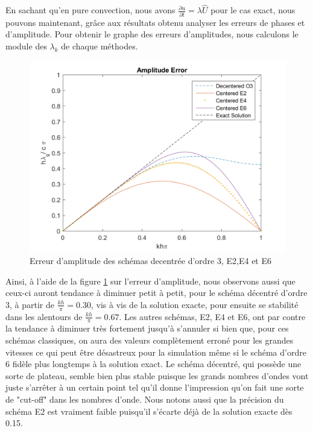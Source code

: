 \documentclass{article}
\begin{document}
En sachant qu'en pure convection, nous avons $ \frac{\partial u}{\partial t} = \lambda \widehat{U}$ pour le cas exact, nous pouvons maintenant, grâce aux résultats obtenu analyser les erreurs de phases et d'amplitude. Pour obtenir le graphe des erreurs d'amplitudes, nous calculons le module des $\lambda_k$ de chaque méthodes.
\begin{figure}[H]
    \centering
    \includegraphics[scale=0.55]{img/fig1.png}
    \caption{Erreur d'amplitude des schémas decentrée d'ordre 3, E2,E4 et E6}
    \label{fig1}
\end{figure}
Ainsi, à l'aide de la figure \ref{fig1} sur l'erreur d'amplitude, nous observons aussi que ceux-ci auront tendance à diminuer petit à petit, pour le schéma décentré d'ordre 3, à partir de $\frac{kh}{\pi}  = 0.30$, vis à vis de la solution exacte, pour ensuite se stabilité dans les alentours de $\frac{kh}{\pi}  = 0.67$. Les autres schémas, E2, E4 et E6, ont par contre la tendance à diminuer très fortement jusqu'à s'annuler si bien que, pour ces schémas classiques, on aura des valeurs complètement erroné pour les grandes vitesses ce qui peut être désastreux pour la simulation même si le schéma d'ordre 6 fidèle plus longtemps à la solution exact. Le schéma décentré, qui possède une sorte de plateau, semble bien plus stable puisque les grands nombres d'ondes vont juste s'arrêter à un certain point tel qu'il donne l'impression qu'on fait une sorte de "cut-off" dans les nombres d'onde. Nous notons aussi que la précision du schéma E2 est vraiment faible puisqu'il s'écarte déjà de la solution exacte dès 0.15. \\
\\
\end{document}
